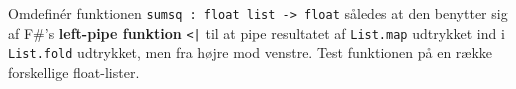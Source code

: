 Omdefinér funktionen \lstinline{sumsq : float list -> float} således
at den benytter sig af F\#'s \textbf{left-pipe funktion} \lstinline{<|} til at
pipe resultatet af \lstinline{List.map} udtrykket ind
i \lstinline{List.fold} udtrykket, men fra højre mod venstre.
%
Test funktionen på en række forskellige float-lister.
